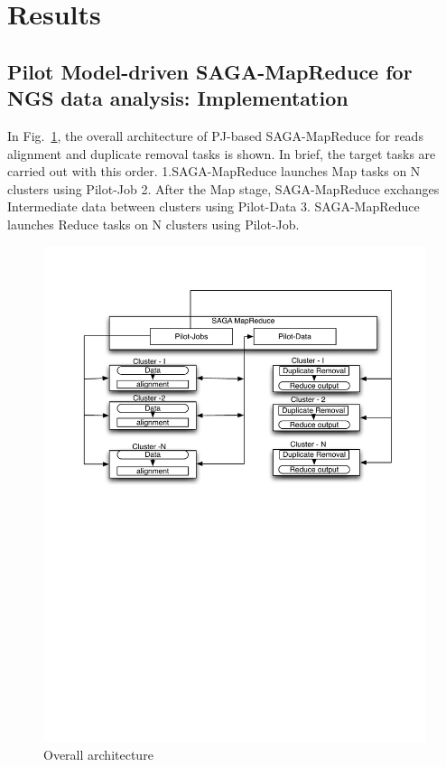 \documentclass{sig-alternate}
\begin{document}



\section{Results}

\subsection{Pilot Model-driven SAGA-MapReduce for NGS data analysis: Implementation}
In Fig.~\ref{fig:arch-pj-saga-mr}, the overall architecture of PJ-based SAGA-MapReduce for reads alignment and duplicate removal tasks is shown.  In brief, the target tasks are carried out with this order. 1.SAGA-MapReduce launches Map tasks on N clusters using Pilot-Job 2. After the Map stage, SAGA-MapReduce exchanges Intermediate data between clusters using Pilot-Data  3. SAGA-MapReduce launches Reduce tasks on N clusters using Pilot-Job.


\begin{figure}
 \centering
\includegraphics[scale=0.45]{figures/align-dup.pdf} 

\caption{\small Overall architecture}
  \label{fig:arch-pj-saga-mr} 
\end{figure}
\end{document}
